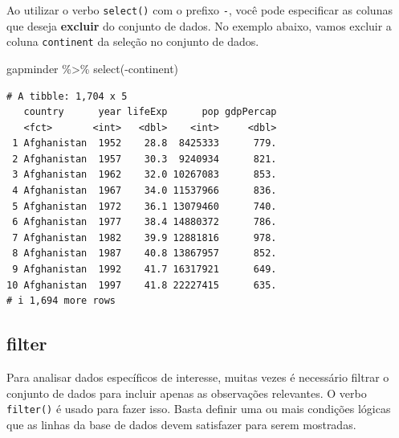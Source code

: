\documentclass[
  portuguese,
  letterpaper,
  DIV=11,
  numbers=noendperiod]{scrreprt}
\newenvironment{Shaded}{\begin{snugshade}}{\end{snugshade}}
\newcommand{\FunctionTok}[1]{\textcolor[rgb]{0.28,0.35,0.67}{#1}}
\newcommand{\NormalTok}[1]{\textcolor[rgb]{0.00,0.23,0.31}{#1}}
\newcommand{\SpecialCharTok}[1]{\textcolor[rgb]{0.37,0.37,0.37}{#1}}
\theoremstyle{definition}
\theoremstyle{remark}
\begin{document}
\begin{tcolorbox}[enhanced jigsaw, leftrule=.75mm, opacitybacktitle=0.6, colback=white, coltitle=black, colframe=quarto-callout-tip-color-frame, titlerule=0mm, left=2mm, opacityback=0, breakable, bottomtitle=1mm, toprule=.15mm, title=\textcolor{quarto-callout-tip-color}{\faLightbulb}\hspace{0.5em}{Dica}, colbacktitle=quarto-callout-tip-color!10!white, arc=.35mm, rightrule=.15mm, bottomrule=.15mm, toptitle=1mm]

Ao utilizar o verbo \texttt{select()} com o prefixo \texttt{-}, você
pode especificar as colunas que deseja \textbf{excluir} do conjunto de
dados. No exemplo abaixo, vamos excluir a coluna \texttt{continent} da
seleção no conjunto de dados.

\begin{Shaded}
\begin{Highlighting}[]
\NormalTok{gapminder }\SpecialCharTok{\%\textgreater{}\%} 
  \FunctionTok{select}\NormalTok{(}\SpecialCharTok{{-}}\NormalTok{continent)}
\end{Highlighting}
\end{Shaded}

\begin{verbatim}
# A tibble: 1,704 x 5
   country      year lifeExp      pop gdpPercap
   <fct>       <int>   <dbl>    <int>     <dbl>
 1 Afghanistan  1952    28.8  8425333      779.
 2 Afghanistan  1957    30.3  9240934      821.
 3 Afghanistan  1962    32.0 10267083      853.
 4 Afghanistan  1967    34.0 11537966      836.
 5 Afghanistan  1972    36.1 13079460      740.
 6 Afghanistan  1977    38.4 14880372      786.
 7 Afghanistan  1982    39.9 12881816      978.
 8 Afghanistan  1987    40.8 13867957      852.
 9 Afghanistan  1992    41.7 16317921      649.
10 Afghanistan  1997    41.8 22227415      635.
# i 1,694 more rows
\end{verbatim}

\end{tcolorbox}

\subsection{filter}\label{filter}

Para analisar dados específicos de interesse, muitas vezes é necessário
filtrar o conjunto de dados para incluir apenas as observações
relevantes. O verbo \texttt{filter()} é usado para fazer isso. Basta
definir uma ou mais condições lógicas que as linhas da base de dados
devem satisfazer para serem mostradas.
\end{document}
